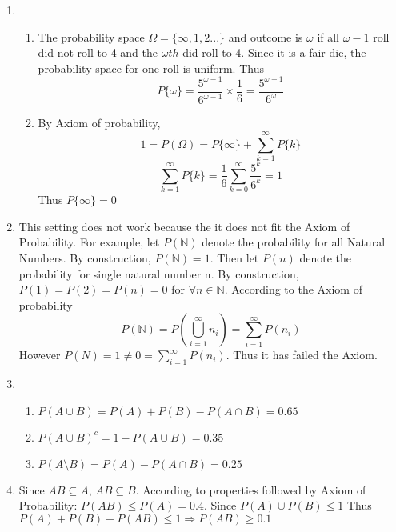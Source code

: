 \documentclass[11pt, oneside]{article}
\newcommand{\N}{\mathbb N}
\begin{document}
\begin{enumerate}
    \item \begin{enumerate}
        \item The probability space $\Omega= \{\infty, 1,2...\}$ and outcome is $\omega$ if all $\omega-1$ roll did not roll to 4 and the $\omega th$ did roll to 4. Since it is a fair die, the probability space for one roll is uniform. Thus
        \[P\{\omega\}= \dfrac{5^{\omega-1}}{6^{\omega-1}}\times \dfrac{1}{6}=\dfrac{5^{\omega-1}}{6^{\omega}}\]
        \item By Axiom of probability, 
        \[1=P(\Omega)=P\{\infty\}+\sum_{k=1}^{\infty}P\{k\}\]
        \[\sum_{k=1}^{\infty}P\{k\}=\dfrac{1}{6}\sum_{k=0}^{\infty}\dfrac{5^k}{6^k}=1\]
        Thus $P\{\infty\}=0$  
    \end{enumerate}
    \item This setting does not work because the it does not fit the Axiom of Probability. For example, let $P(\N)$ denote the probability for all Natural Numbers. By construction, $P(\N)=1$. Then let $P(n)$ denote the probability for single natural number n. By construction, $P(1)=P(2)=P(n)=0$ for $\forall n\in \N$. According to the Axiom of probability 
    \[ P(\N)=P(\bigcup^{\infty}_{i=1}n_i)=\sum^{\infty}_{i=1}P(n_i)\]
    However $P(N)=1\neq 0=\sum^{\infty}_{i=1}P(n_i)$. Thus it has failed the Axiom.
    
    \item \begin{enumerate}
        \item $P(A\cup B)= P(A)+P(B)-P(A\cap B)=0.65$
        \item $P(A\cup B)^c =1-P(A\cup B)=0.35$
        \item $P(A\setminus B)=P(A)-P(A\cap B)=0.25$
    \end{enumerate}
    \item Since $AB\subseteq A$, $AB\subseteq B$. According to properties followed by Axiom of Probability: $P(AB)\leq P(A)=0.4$. 
    \newline Since $P(A)\cup P(B)\leq 1$ Thus $P(A)+P(B)-P(AB)\leq 1 \Rightarrow P(AB)\geq 0.1$
    

\end{enumerate}
\end{document}
